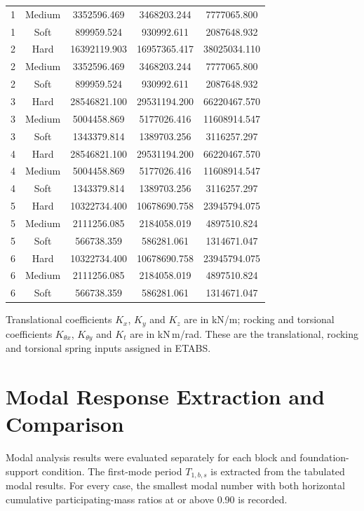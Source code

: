 \begin{minipage}{\linewidth}
\begin{tabular*}{\linewidth}{@{\extracolsep{\fill}}ccccc@{}}
1 & Medium & 3352596.469 & 3468203.244 & 7777065.800 \\
1 & Soft & 899959.524 & 930992.611 & 2087648.932 \\
2 & Hard & 16392119.903 & 16957365.417 & 38025034.110 \\
2 & Medium & 3352596.469 & 3468203.244 & 7777065.800 \\
2 & Soft & 899959.524 & 930992.611 & 2087648.932 \\
3 & Hard & 28546821.100 & 29531194.200 & 66220467.570 \\
3 & Medium & 5004458.869 & 5177026.416 & 11608914.547 \\
3 & Soft & 1343379.814 & 1389703.256 & 3116257.297 \\
4 & Hard & 28546821.100 & 29531194.200 & 66220467.570 \\
4 & Medium & 5004458.869 & 5177026.416 & 11608914.547 \\
4 & Soft & 1343379.814 & 1389703.256 & 3116257.297 \\
5 & Hard & 10322734.400 & 10678690.758 & 23945794.075 \\
5 & Medium & 2111256.085 & 2184058.019 & 4897510.824 \\
5 & Soft & 566738.359 & 586281.061 & 1314671.047 \\
6 & Hard & 10322734.400 & 10678690.758 & 23945794.075 \\
6 & Medium & 2111256.085 & 2184058.019 & 4897510.824 \\
6 & Soft & 566738.359 & 586281.061 & 1314671.047 \\
\bottomrule
\end{tabular*}
\par\smallskip\fontsize{11}{13}\selectfont Translational coefficients $K_x$, $K_y$ and $K_z$ are in kN/m; rocking and torsional coefficients $K_{\theta x}$, $K_{\theta y}$ and $K_t$ are in kN\,m/rad. These are the translational, rocking and torsional spring inputs assigned in ETABS.
\end{minipage}\par
\FloatBarrier

\section{Modal Response Extraction and Comparison}
Modal analysis results were evaluated separately for each block and foundation-support condition. The first-mode period $T_{1,b,s}$ is extracted from the tabulated modal results. For every case, the smallest modal number with both horizontal cumulative participating-mass ratios at or above 0.90 is recorded. 

